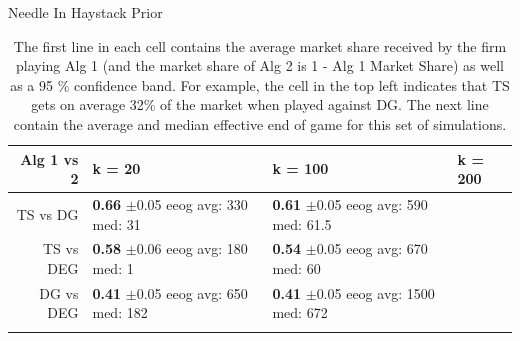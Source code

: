 \documentclass{article}
\theoremstyle{definition}
\begin{document}
\begin{table}[ht]
\centering
\caption{Needle In Haystack Prior} 
\begin{tabular}{rlll}
  \hline
Alg 1 vs 2 & k = 20 & k = 100 & k = 200 \\ 
  \hline
TS vs DG & \makecell{\textbf{0.66} $\pm$0.05\\ eeog \\ avg: 330\\ med: 31} & \makecell{\textbf{0.61} $\pm$0.05\\ eeog \\ avg: 590\\ med: 61.5} &  \\
\hline 
  TS vs DEG & \makecell{\textbf{0.58} $\pm$0.06\\ eeog \\ avg: 180\\ med: 1} & \makecell{\textbf{0.54} $\pm$0.05\\ eeog \\ avg: 670\\ med: 60} &  \\ 
  \hline 
  DG vs DEG & \makecell{\textbf{0.41} $\pm$0.05\\ eeog \\ avg: 650\\ med: 182} & \makecell{\textbf{0.41} $\pm$0.05\\ eeog \\ avg: 1500\\ med: 672} &  \\ 
   \hline
   \label{hm_nih}
   \end{tabular}
\caption*{\tiny{The first line in each cell contains the average market share received by the firm playing Alg 1 (and the market share of Alg 2 is 1 - Alg 1 Market Share) as well as a 95 \% confidence band. For example, the cell in the top left indicates that TS gets on average 32\% of the market when played against DG. The next line contain the average and median effective end of game for this set of simulations.}}
\end{table}
\end{document}
